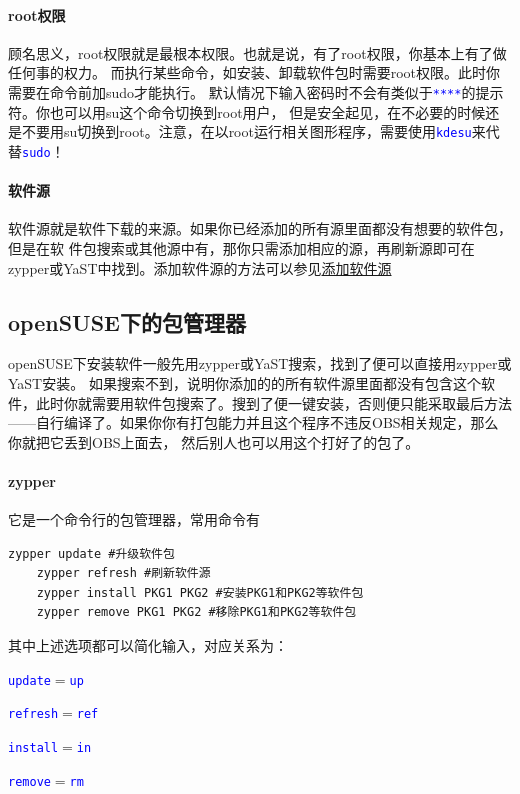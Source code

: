 \documentclass[12pt,openany]{book}
\newcommand{\command}[1]{\texttt{\textcolor{blue}{#1}}}
\newcommand{\zy}{zypper或YaST}
\newcommand{\simp}[2]{\command{#1}$=$\command{#2}}
\begin{document}
\paragraph{root权限} 顾名思义，root权限就是最根本权限。也就是说，有了root权限，你基本上有了做任何事的权力。
而执行某些命令，如安装、卸载软件包时需要root权限。此时你需要在命令前加sudo才能执行。
默认情况下输入密码时不会有类似于\command{****}的提示符。你也可以用su这个命令切换到root用户，
但是安全起见，在不必要的时候还是不要用su切换到root。注意，在以root运行相关图形程序，需要使用\command{kdesu}来代替\command{sudo}！

\paragraph{软件源} 软件源就是软件下载的来源。如果你已经添加的所有源里面都没有想要的软件包，但是在软
件包搜索或其他源中有，那你只需添加相应的源，再刷新源即可在\zy 中找到。添加软件源的方法可以参见\href{https://zh.opensuse.org/SDB:%E6%B7%BB%E5%8A%A0%E8%BD%AF%E4%BB%B6%E6%BA%90}{添加软件源}
\subsection[包管理器]{openSUSE下的包管理器}
openSUSE下安装软件一般先用\zy 搜索，找到了便可以直接用\zy 安装。
如果搜索不到，说明你添加的的所有软件源里面都没有包含这个软件，此时你就需要用软件包搜索了。搜到了便一键安装，否则便只能采取最后方法——自行编译了。如果你你有打包能力并且这个程序不违反OBS相关规定，那么你就把它丢到OBS上面去，
然后别人也可以用这个打好了的包了。
\paragraph{zypper}\label{pre} 它是一个命令行的包管理器，常用命令有
\begin{Verbatim}[formatcom=\color{codecolor}]
    zypper update #升级软件包
    zypper refresh #刷新软件源
    zypper install PKG1 PKG2 #安装PKG1和PKG2等软件包
    zypper remove PKG1 PKG2 #移除PKG1和PKG2等软件包
\end{Verbatim}
其中上述选项都可以简化输入，对应关系为：
\begin{compactitem}
 \item \simp{update}{up}
 \item \simp{refresh}{ref}
 \item \simp{install}{in}
 \item \simp{remove}{rm}
\end{compactitem}
\end{document}
